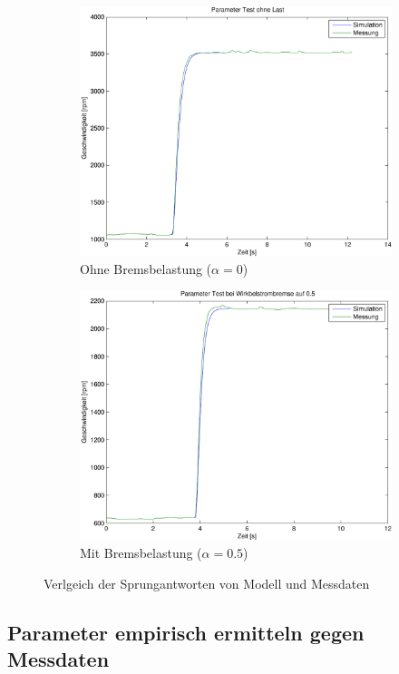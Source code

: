 \begin{figure}[h!]
	\centering
	\begin{subfigure}{0.475\textwidth}
		\includegraphics[width=1\textwidth]{07/parameter_test_noload.pdf}
		\caption{Ohne Bremsbelastung ($\alpha = 0$)}
	\end{subfigure}
	\begin{subfigure}{0.475\textwidth}
		\includegraphics[width=1\textwidth]{07/parameter_test_load.pdf}
		\caption{Mit Bremsbelastung ($\alpha = 0.5$)}
	\end{subfigure}
	\caption{Verlgeich der Sprungantworten von Modell und Messdaten}
\end{figure}

\subsection{Parameter empirisch ermitteln gegen Messdaten}

